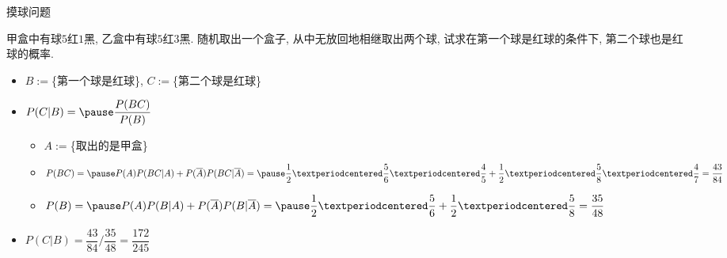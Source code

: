 \begin{frame}{摸球问题}
	\begin{exam}
		甲盒中有球$5$红$1$黑, 乙盒中有球$5$红$3$黑. 随机取出一个盒子, 从中无放回地相继取出两个球, 试求在第一个球是红球的条件下, 第二个球也是红球的概率.
	\end{exam}
	\pause

	\begin{jieda}
		\begin{itemize}[<+-|alert@+>]
			\item $B:=$\{第一个球是红球\}, $C:=$\{第二个球是红球\}
			\item $P(C|B)=\pause \dfrac{P(BC)}{P(B)}$ \pause
			\begin{itemize}[<+-|alert@+>]
				\item $A:=$\{取出的是甲盒\}
				\item $P(BC)=\pause P(A)P(BC|A)+P(\overline{A})P(BC|\overline{A})=\pause \dfrac{1}{2}·\dfrac{5}{6}·\dfrac{4}{5}+\dfrac{1}{2}·\dfrac{5}{8}·\dfrac{4}{7}=\dfrac{43}{84}$


				\item $P(B)=\pause P(A)P(B|A)+P(\overline{A})P(B|\overline{A})=\pause \dfrac{1}{2}·\dfrac{5}{6}+\dfrac{1}{2}·\dfrac{5}{8}=\dfrac{35}{48}$%
			\end{itemize}
			\item $P(C|B)=\dfrac{43}{84}/\dfrac{35}{48}=\dfrac{172}{245}$
		\end{itemize}

	\end{jieda}
\end{frame}


